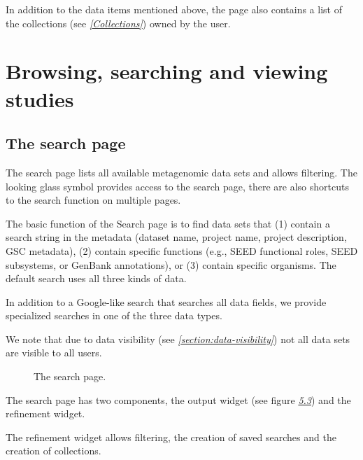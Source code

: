 \documentclass[letterpaper,10pt,english]{sphinxmanual}
\begin{document}
In addition to the data items mentioned above, the page also contains a
list of the collections (see {\hyperref[\detokenize{user_manual:Collections}]{\emph{{[}Collections{]}}}}) owned by
the user.


\section{Browsing, searching and viewing studies}
\label{\detokenize{user_manual:browsing-searching-and-viewing-studies}}

\subsection{The search page}
\label{\detokenize{user_manual:the-search-page}}\label{\detokenize{user_manual:section-search-page}}
The search page lists all available metagenomic data sets and allows
filtering. The looking glass symbol provides access to the search page,
there are also shortcuts to the search function on multiple pages.

The basic function of the Search page is to find data sets that (1)
contain a search string in the metadata (dataset name, project name,
project description, GSC metadata), (2) contain specific functions
(e.g., SEED functional roles, SEED subsystems, or GenBank annotations),
or (3) contain specific organisms. The default search uses all three
kinds of data.

In addition to a Google-like search that searches all data fields, we
provide specialized searches in one of the three data types.

We note that due to data visibility (see
{\hyperref[\detokenize{user_manual:section:data-visibility}]{\emph{{[}section:data-visibility{]}}}}) not all data
sets are visible to all users.

\begin{figure}[htbp]
\centering
\capstart

\noindent{}
\caption{The search page.}\label{\detokenize{user_manual:fig-v4-search}}\end{figure}

The search page has two components, the output widget (see figure
{\hyperref[\detokenize{user_manual:fig:v4-search}]{\emph{5.3}}}) and the refinement widget.

The refinement widget allows filtering, the creation of saved searches
and the creation of collections.
\end{document}
